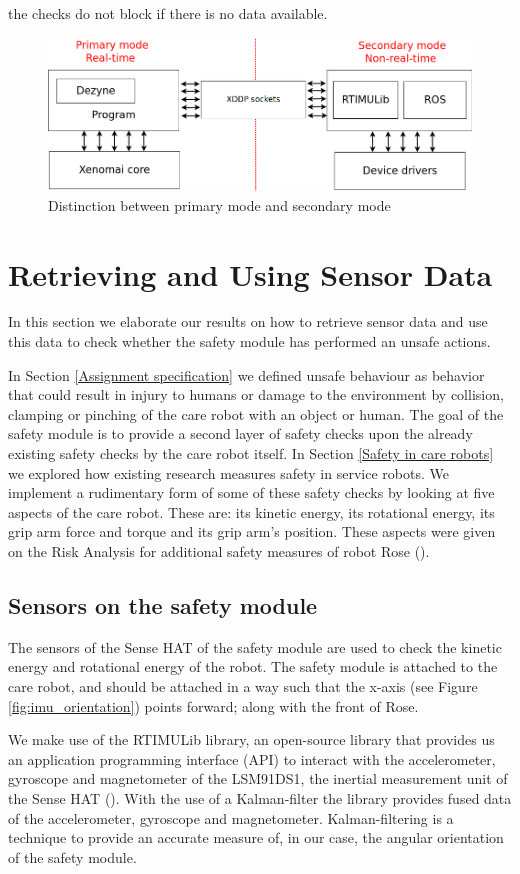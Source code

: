 \documentclass[12pt]{scrreprt}
\begin{document}
the checks do not block if there is no data available.

\begin{figure}[H]
    \centering
    \includegraphics[width=\textwidth]{Figures/results/communication_scheme.png}
    \caption{Distinction between primary mode and secondary mode}
    \label{fig:communication_scheme}
\end{figure}

\newpage
\section{Retrieving and Using Sensor Data}
\label{Retrieving and Using Sensor Data}
In this section we elaborate our results on how to retrieve sensor data and use this data to check whether the safety module has performed an unsafe actions.
\par
In Section \ref{Assignment specification} we defined unsafe behaviour as behavior that could result in injury to humans or damage to the environment by collision, clamping or pinching of the care robot with an object or human. The goal of the safety module is to provide a second layer of safety checks upon the already existing safety checks by the care robot itself. In Section \ref{Safety in care robots} we explored how existing research measures safety in service robots. We implement a rudimentary form of some of these safety checks by looking at five aspects of the care robot. These are: its kinetic energy, its rotational energy, its grip arm force and torque and its grip arm's position. These aspects were given on the Risk Analysis for additional safety measures of robot Rose (\cite{risk_analysis_additional}).

\subsection{Sensors on the safety module}
The sensors of the Sense HAT of the safety module are used to check the kinetic energy and rotational energy of the robot. The safety module is attached to the care robot, and should be attached in a way such that the x-axis (see Figure \ref{fig:imu_orientation}) points forward; along with the front of Rose.
\par
We make use of the RTIMULib library, an open-source library that provides us an application programming interface (API) to interact with the accelerometer, gyroscope and magnetometer of the LSM91DS1, the inertial measurement unit of the Sense HAT (\cite{rtimulib}). With the use of a Kalman-filter the library provides fused data of the accelerometer, gyroscope and magnetometer. Kalman-filtering is a technique to provide an accurate measure of, in our case, the angular orientation of the safety module.
\end{document}
